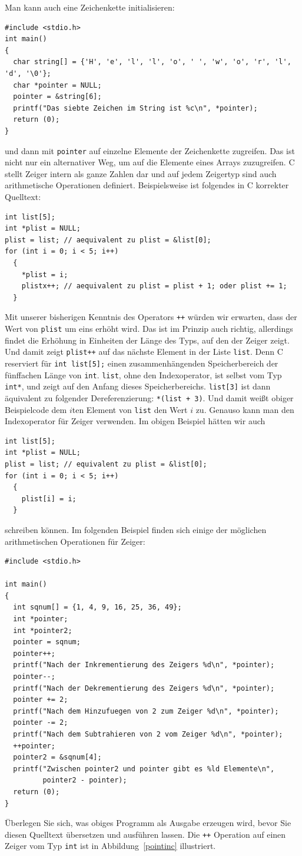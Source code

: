 Man kann auch eine Zeichenkette initialisieren:
\begin{lstlisting}
#include <stdio.h>
int main()
{
  char string[] = {'H', 'e', 'l', 'l', 'o', ' ', 'w', 'o', 'r', 'l', 'd', '\0'};
  char *pointer = NULL;
  pointer = &string[6];
  printf("Das siebte Zeichen im String ist %c\n", *pointer);
  return (0);
}
\end{lstlisting}
und dann mit \verb|pointer| auf einzelne Elemente der Zeichenkette zugreifen.
Das ist nicht nur ein alternativer Weg, um auf die Elemente eines Arrays zuzugreifen.
C stellt Zeiger intern als ganze Zahlen dar und auf jedem Zeigertyp sind auch arithmetische Operationen definiert.
Beispielsweise ist folgendes in C korrekter Quelltext:
\begin{lstlisting}
int list[5];
int *plist = NULL;
plist = list; // aequivalent zu plist = &list[0];
for (int i = 0; i < 5; i++)
  {
    *plist = i;
    plistx++; // aequivalent zu plist = plist + 1; oder plist += 1;
  }
\end{lstlisting}
Mit unserer bisherigen Kenntnis des Operators \verb|++| würden wir erwarten, dass der Wert von \verb|plist| um eins erhöht wird.
Das ist im Prinzip auch richtig, allerdings findet die Erhöhung in Einheiten der Länge des Typs, auf den der Zeiger zeigt.
Und damit zeigt \verb|plist++| auf das nächste Element in der Liste \verb|list|.
Denn C reserviert für \verb|int list[5];| einen zusammenhängenden Speicherbereich der fünffachen Länge von \verb|int|.
\verb|list|, ohne den Indexoperator, ist selbst vom Typ \verb|int*|, und zeigt auf den Anfang dieses Speicherbereichs.
\verb|list[3]| ist dann äquivalent zu folgender Dereferenzierung: \verb|*(list + 3)|.
Und damit weißt obiger Beispielcode dem $i$ten Element von \verb|list| den Wert $i$ zu.
Genauso kann man den Indexoperator für Zeiger verwenden.
Im obigen Beispiel hätten wir auch
\begin{lstlisting}
int list[5];
int *plist = NULL;
plist = list; // equivalent zu plist = &list[0];
for (int i = 0; i < 5; i++)
  {
    plist[i] = i;
  }
\end{lstlisting}
schreiben können.
Im folgenden Beispiel finden sich einige der möglichen arithmetischen Operationen für Zeiger:
\begin{lstlisting}
#include <stdio.h>

int main()
{
  int sqnum[] = {1, 4, 9, 16, 25, 36, 49};
  int *pointer;
  int *pointer2;
  pointer = sqnum;
  pointer++;
  printf("Nach der Inkrementierung des Zeigers %d\n", *pointer);
  pointer--;
  printf("Nach der Dekrementierung des Zeigers %d\n", *pointer);
  pointer += 2;
  printf("Nach dem Hinzufuegen von 2 zum Zeiger %d\n", *pointer);
  pointer -= 2;
  printf("Nach dem Subtrahieren von 2 vom Zeiger %d\n", *pointer);
  ++pointer;
  pointer2 = &sqnum[4];
  printf("Zwischen pointer2 und pointer gibt es %ld Elemente\n",
         pointer2 - pointer);
  return (0);
}
\end{lstlisting}
Überlegen Sie sich, was obiges Programm als Ausgabe erzeugen wird, bevor Sie diesen Quelltext übersetzen und ausführen lassen.
Die \verb|++| Operation auf einen Zeiger vom Typ \verb|int| ist in Abbildung~\ref{pointinc} illustriert.

